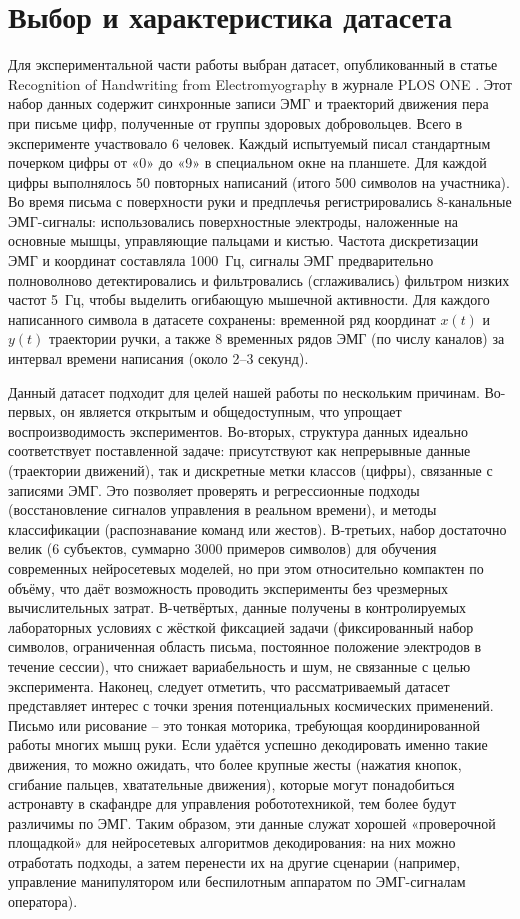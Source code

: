 \documentclass[12pt,a4paper]{article}
\begin{document}
\section{Выбор и характеристика датасета}
Для экспериментальной части работы выбран датасет, опубликованный в статье Recognition of Handwriting from Electromyography  в журнале PLOS ONE \cite{35}. Этот набор данных содержит синхронные записи ЭМГ и траекторий движения пера при письме цифр, полученные от группы здоровых добровольцев. Всего в эксперименте участвовало 6 человек. Каждый испытуемый писал стандартным почерком цифры от «0» до «9» в специальном окне на планшете. Для каждой цифры выполнялось 50 повторных написаний (итого 500 символов на участника). Во время письма с поверхности руки и предплечья регистрировались 8-канальные ЭМГ-сигналы: использовались поверхностные электроды, наложенные на основные мышцы, управляющие пальцами и кистью. Частота дискретизации ЭМГ и координат составляла 1000~Гц, сигналы ЭМГ предварительно полноволново детектировались и фильтровались (сглаживались) фильтром низких частот 5~Гц, чтобы выделить огибающую мышечной активности. Для каждого написанного символа в датасете сохранены: временной ряд координат $x(t)$ и $y(t)$ траектории ручки, а также 8 временных рядов ЭМГ (по числу каналов) за интервал времени написания (около 2--3 секунд).


Данный датасет подходит для целей нашей работы по нескольким причинам. Во-первых, он является открытым и общедоступным, что упрощает воспроизводимость экспериментов. Во-вторых, структура данных идеально соответствует поставленной задаче: присутствуют как непрерывные данные (траектории движений), так и дискретные метки классов (цифры), связанные с записями ЭМГ. Это позволяет проверять и регрессионные подходы (восстановление сигналов управления в реальном времени), и методы классификации (распознавание команд или жестов). В-третьих, набор достаточно велик (6 субъектов, суммарно 3000 примеров символов) для обучения современных нейросетевых моделей, но при этом относительно компактен по объёму, что даёт возможность проводить эксперименты без чрезмерных вычислительных затрат. В-четвёртых, данные получены в контролируемых лабораторных условиях с жёсткой фиксацией задачи (фиксированный набор символов, ограниченная область письма, постоянное положение электродов в течение сессии), что снижает вариабельность и шум, не связанные с целью эксперимента.
Наконец, следует отметить, что рассматриваемый датасет представляет интерес с точки зрения потенциальных космических применений. Письмо или рисование – это тонкая моторика, требующая координированной работы многих мышц руки. Если удаётся успешно декодировать именно такие движения, то можно ожидать, что более крупные жесты (нажатия кнопок, сгибание пальцев, хватательные движения), которые могут понадобиться астронавту в скафандре для управления робототехникой, тем более будут различимы по ЭМГ. Таким образом, эти данные служат хорошей «проверочной площадкой» для нейросетевых алгоритмов декодирования: на них можно отработать подходы, а затем перенести их на другие сценарии (например, управление манипулятором или беспилотным аппаратом по ЭМГ-сигналам оператора).
\end{document}
